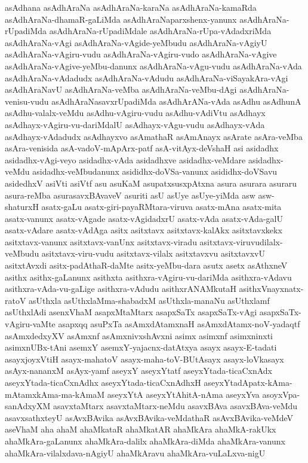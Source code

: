 {asAdhana
asAdhAraNa
asAdhAraNa-karaNa
asAdhAraNa-kamaRda
asAdhAraNa-dhamaR-gaLiMda
asAdhAraNaparxshenx-yanunx
asAdhAraNa-rUpadiMda
asAdhAraNa-rUpadiMdale
asAdhAraNa-rUpa-vAdadxriMda
asAdhAraNa-vAgi
asAdhAraNa-vAgide-yeMbudu
asAdhAraNa-vAgiyU
asAdhAraNa-vAgiru-vudu
asAdhAraNa-vAgiru-vudo
asAdhAraNa-vAgive
asAdhAraNa-vAgive-yeMbu-danunx
asAdhAraNa-vAgu-vudu
asAdhAraNa-vAda
asAdhAraNa-vAdadudx
asAdhAraNa-vAdudu
asAdhAraNa-viSayakAra-vAgi
asAdhAraNavU
asAdhAraNa-veMba
asAdhAraNa-veMbu-dAgi
asAdhAraNa-venisu-vudu
asAdhAraNasavxrUpadiMda
asAdhArANa-vAda
asAdhu
asAdhunA
asAdhu-valalx-veMdu
asAdhu-vAgiru-vudu
asAdhu-vAdiVtu
asAdhayx
asAdhayx-vAgiru-vu-dariMdalU
asAdhayx-vAgu-vudu
asAdhayx-vAda
asAdhayx-vAdadudx
asAdhayxvo
asAmathaR
asAmAnayx
asArate
asAra-veMba
asAra-venisida
asA-vadoV-mApArx-patf
asA-vitAyx-deVshaH
asi
asidadhx
asidadhx-vAgi-veyo
asidadhx-vAda
asidadhxve
asidadhx-veMdare
asidadhx-veMdu
asidadhx-veMbudanunx
asididhx-doVSa-vanunx
asididhx-doVSavu
asidedhxV
asiVti
asiVtf
asu
asuKaM
asupatxsusxpAtxna
asura
asurara
asuraru
asura-reMba
asurasavxBAvaveV
asuriti
asU
asUye
asUye-yiMda
asw
asw-shaturxH
asatx-gaLu
asatx-giri-payaRMtara-viruva
asatx-mAna
asatx-mita
asatx-vanunx
asatx-vAgade
asatx-vAgidadxrU
asatx-vAda
asatx-vAda-galU
asatx-vAdare
asatx-vAdAga
asitx
asitxtavx
asitxtavx-kalAkx
asitxtavxkekx
asitxtavx-vanunx
asitxtavx-vanUnx
asitxtavx-viradu
asitxtavx-viruvudilalx-veMbudu
asitxtavx-viru-vudu
asitxtavx-vilalx
asitxtavxvu
asitxtavxvU
asitxtAvxdi
asitx-padAthaR-daMte
asitx-yeMbu-dara
asutx
asetx
asAthxneV
asithx
asithx-gaLanunx
asithxta
asithxra-vAgiru-vu-dariMda
asithxra-vAdavu
asithxra-vAda-vu-gaLige
asithxra-vAdudu
asithxrANAMkutaH
asithxVnayxnatx-ratoV
asUthxla
asUthxlaMma-shabadxM
asUthxla-manaNu
asUthxlamf
asUthxlAdi
asenxVhaM
asapxMtaMtarx
asapxSaTx
asapxSaTx-vAgi
asapxSaTx-vAgiru-vaMte
asapxqq
asuPxTa
asAmxdAtamxnaH
asAmxdAtamx-noV-yadaqtf
asAmxdedxyXV
asAmxnf
asAmxnivxshAvxni
asimx
asimxnf
asimxninxti
asimxnUBx-tAni
asemxY
asemxY-yajacnx-datAtxya
asayx
asayx-E-tadati
asayxjoyxVtiH
asayx-mahatoV
asayx-maha-toV-BUtAsayx
asayx-loVkasayx
asAyx-nananxM
asAyx-yamf
aseyxY
aseyxYtatf
aseyxYtada-ticaCxnAdx
aseyxYtada-ticaCxnAdhx
aseyxYtada-ticaCxnAdhxH
aseyxYtadApatx-kAma-mAtamxkAma-ma-kAmaM
aseyxYtA
aseyxYtAhitA-nAma
aseyxYva
asoyxVpa-sanAdxyXM
asavxtaMtarx
asavxtaMtarx-neMdu
asavxBAva
asavxBAva-veMdu
asavxsathxteyU
asAvxBAvika
asAvxBAvika-veMdathaR
asAvxBAvika-veMdeV
aseVhaM
aha
ahaM
ahaMkataR
ahaMkatAR
ahaMkAra
ahaMkA-rakUkx
ahaMkAra-gaLanunx
ahaMkAra-dalilx
ahaMkAra-diMda
ahaMkAra-vanunx
ahaMkAra-vilalxdava-nAgiyU
ahaMkAravu
ahaMkAra-vuLaLxva-nigU
}
